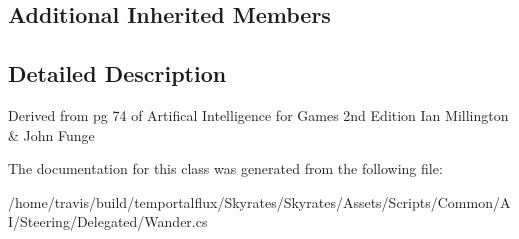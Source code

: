 \subsection*{Additional Inherited Members}


\subsection{Detailed Description}


Derived from pg 74 of Artifical Intelligence for Games 2nd Edition Ian Millington \& John Funge 

The documentation for this class was generated from the following file\-:\begin{DoxyCompactItemize}
\item 
/home/travis/build/temportalflux/\-Skyrates/\-Skyrates/\-Assets/\-Scripts/\-Common/\-A\-I/\-Steering/\-Delegated/Wander.\-cs\end{DoxyCompactItemize}
